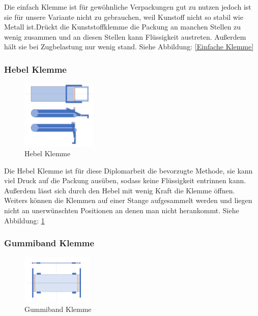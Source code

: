 Die einfach Klemme ist für gewöhnliche Verpackungen gut zu nutzen jedoch ist sie für unsere Variante nicht zu gebrauchen, weil Kunstoff nicht so stabil wie Metall ist.Drückt die Kunststoffklemme die Packung an manchen Stellen zu wenig zusammen und an diesen Stellen kann Flüssigkeit austreten. Außerdem hält sie bei Zugbelastung nur wenig stand. Siehe Abbildung: \ref{Einfache Klemme}

\subsubsection{Hebel Klemme} 

\begin{figure}
\vspace{-30pt}
  \begin{center}
    \includegraphics[width=0.32\textwidth]{Bilder/Powerpoint/Hebel_Klemme}
  \end{center}
  \caption{Hebel Klemme}
  \label{Hebel Klemme}
  \vspace{-10pt}
\end{figure}

Die Hebel Klemme ist für diese Diplomarbeit die bevorzugte Methode, sie kann viel Druck auf die Packung ausüben, sodass keine Flüssigkeit entrinnen kann. Außerdem lässt sich durch den Hebel mit wenig Kraft die Klemme öffnen. Weiters können die Klemmen auf einer Stange aufgesammelt werden und liegen nicht an unerwünschten Positionen an denen man nicht herankommt. Siehe Abbildung: \ref{Hebel Klemme}
 \vspace{40pt}


\subsubsection{Gummiband Klemme}
 
\begin{figure}
\vspace{-40pt}
  \begin{center}
    \includegraphics[width=0.30\textwidth]{Bilder/Powerpoint/Gummiband_Klemme}
  \end{center}
  \caption{Gummiband Klemme}
  \label{Gummiband Klemme}
  \vspace{-10pt}
\end{figure}

